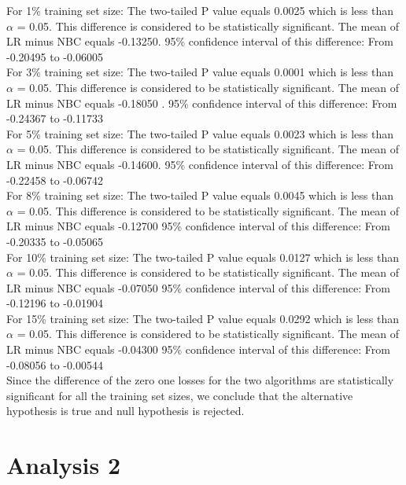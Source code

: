 \documentclass[12pt]{article}
\begin{document}
For 1\% training set size:
  The two-tailed P value equals 0.0025 which is less than $\alpha$ = 0.05.
  This difference is considered to be statistically significant. 
  The mean of LR minus NBC equals -0.13250.
  95\% confidence interval of this difference: From -0.20495 to -0.06005 \\

For 3\% training set size:
  The two-tailed P value equals 0.0001  which is less than $\alpha$ = 0.05.
  This difference is considered to be statistically significant. 
  The mean of LR minus NBC equals -0.18050 .
  95\% confidence interval of this difference: From -0.24367 to -0.11733 \\

For 5\% training set size:
  The two-tailed P value equals 0.0023  which is less than $\alpha$ = 0.05.
  This difference is considered to be statistically significant. 
  The mean of LR minus NBC equals -0.14600.
  95\% confidence interval of this difference: From -0.22458 to -0.06742  \\

For 8\% training set size:
  The two-tailed P value equals 0.0045  which is less than $\alpha$ = 0.05.
  This difference is considered to be statistically significant. 
  The mean of LR minus NBC equals -0.12700 
  95\% confidence interval of this difference: From -0.20335 to -0.05065 \\

For 10\% training set size:
  The two-tailed P value equals 0.0127  which is less than $\alpha$ = 0.05.
  This difference is considered to be statistically significant. 
  The mean of LR minus NBC equals -0.07050 
  95\% confidence interval of this difference: From -0.12196 to -0.01904 \\

For 15\% training set size:
  The two-tailed P value equals 0.0292  which is less than $\alpha$ = 0.05.
  This difference is considered to be statistically significant. 
  The mean of LR minus NBC equals  -0.04300 
  95\% confidence interval of this difference: From -0.08056 to -0.00544  \\

Since the difference of the zero one losses for the two algorithms are statistically significant
for all the training set sizes, we conclude that the alternative hypothesis is true and null 
hypothesis is rejected.

\section{Analysis 2}
\end{document}
